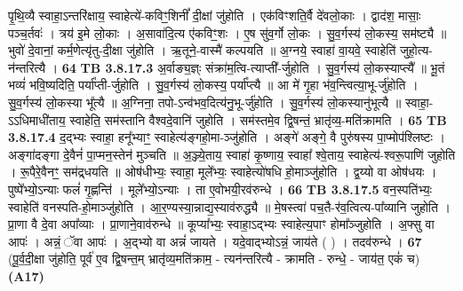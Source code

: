\documentclass[17pt]{extarticle}
\begin{document}
{{{{{{{{{{{{{{{{{{{{{{                  पृ॒थि॒व्यै स्वाहा॒ऽन्तरि॑क्षाय॒ स्वाहेत्ये॑-कविꣳ॒॒शिनीं᳚ दी॒क्षां जु॑होति । एक॑विꣳशति॒र्वै दे॑वलो॒काः । द्वाद॑श॒ मासाः॒ पञ्च॒र्तवः॑ । त्रय॑ इ॒मे लो॒काः । अ॒सावा॑दि॒त्य ए॑कविꣳ॒॒शः । ए॒ष सु॑व॒र्गो लो॒कः । सु॒व॒र्गस्य॑ लो॒कस्य॒ सम॑ष्ट्यै ॥ भुवो॑ दे॒वानां॒ कर्म॒णेत्यृ॑तु-दी॒क्षा जु॑होति । ऋ॒तूने॒-वास्मै॑ कल्पयति ॥ अ॒ग्नये॒ स्वाहा॑ वा॒यवे॒ स्वाहेति॑ जुहो॒त्य-न॑न्तरित्यै । \textbf{ 64} \newline
                  \newline
                                \textbf{ TB 3.8.17.3} \newline
                  अ॒र्वाङ्य॒ज्ञ्ः संक्रा॑म॒त्वि-त्याप्ती᳚-र्जुहोति । सु॒व॒र्गस्य॑ लो॒कस्याप्त्यै᳚ ॥ भू॒तं भव्यं॑ भवि॒ष्यदिति॒ पर्या᳚प्ती-र्जुहोति । सु॒व॒र्गस्य॑ लो॒कस्य॒ पर्या᳚प्त्यै ॥ आ मे॑ गृ॒हा भ॑व॒न्त्वित्या॒भू-र्जु॑होति । सु॒व॒र्गस्य॑ लो॒कस्या भू᳚त्यै ॥ अ॒ग्निना॒ तपो-ऽन्व॑भव॒दित्य॑नु॒भू-र्जु॑होति । सु॒व॒र्गस्य॑ लो॒कस्यानु॑भूत्यै ॥ स्वाहा॒-ऽऽधिमाधी॑ताय॒ स्वाहेति॒ सम॑स्तानि वैश्वदे॒वानि॑ जुहोति । सम॑स्तमे॒व द्वि॒षन्तं॒ भ्रातृ॑व्य॒-मति॑क्रामति । \textbf{ 65} \newline
                  \newline
                                \textbf{ TB 3.8.17.4} \newline
                  द॒द्भ्यः स्वाहा॒ हनू᳚भ्याꣳ॒॒ स्वाहेत्य॑ङ्गहो॒मा-ञ्जु॑होति । अङ्गे॑ अङ्गे॒ वै पुरु॑षस्य पा॒प्मोप॑श्लिष्टः । अङ्गा॑दङ्गा दे॒वैनं॑ पा॒प्मन॒स्तेन॑ मुञ्चति ॥ अ॒ञ्ज्ये॒ताय॒ स्वाहा॑ कृ॒ष्णाय॒ स्वाहा᳚ श्वे॒ताय॒ स्वाहेत्य॑-श्वरू॒पाणि॑ जुहोति । रू॒पैरे॒वैनꣳ॒॒ सम॑द्र्धयति ॥ ओष॑धीभ्यः॒ स्वाहा॒ मूले᳚भ्यः॒ स्वाहेत्यो॑षधि हो॒माञ्जु॑होति । द्व॒य्यो वा ओष॑धयः । पुष्पे᳚भ्यो॒ऽन्याः फलं॑ गृ॒ह्णन्ति॑ । मूले᳚भ्यो॒ऽन्याः । ता ए॒वोभयी॒रव॑रुन्धे । \textbf{ 66} \newline
                  \newline
                                \textbf{ TB 3.8.17.5} \newline
                  वन॒स्पति॑भ्यः॒ स्वाहेति॑ वनस्पति-हो॒माञ्जु॑होति । आ॒र॒ण्यस्या॒न्नाद्य॒स्याव॑रुद्ध्यै ॥ मे॒षस्त्वा॑ पच॒तै-र॑व॒त्वित्य-पा᳚व्यानि जुहोति । प्रा॒णा वै दे॒वा अपा᳚व्याः । प्रा॒णाने॒वाव॑रुन्धे ॥ कूप्या᳚भ्यः॒ स्वाहा॒ऽद्भ्यः स्वाहेत्य॒पाꣳ होमा᳚ञ्जुहोति । अ॒फ्सु वा आपः॑ । अन्नं॒ ॅवा आपः॑ । अ॒द्भ्यो वा अन्नं॑ जायते । यदे॒वाद्भ्योऽन्नं॒ जाय॑ते ( ) । तदव॑रुन्धे । \textbf{ 67} \newline
                  \newline
                                    (पू॒र्व॒दी॒क्षा जु॑होति॒ पूर्व॑ ए॒व द्वि॒षन्त॒म् भ्रातृ॑व्य॒मति॑क्राम॒ - त्यन॑न्तरित्यै - क्रामति - रुन्धे॒ - जाय॑त॒ एकं॑ च) \textbf{(A17)} \newline \newline
}}}}}}}}}}}}}}}}}}}}}}
\end{document}
